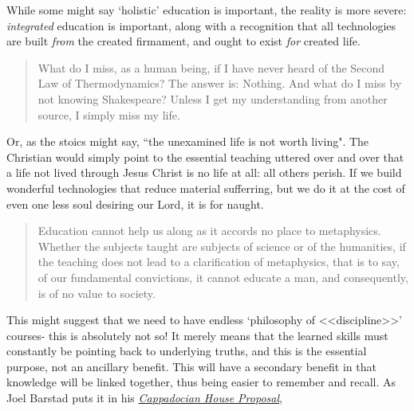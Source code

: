 \documentclass[letterpaper]{article}
\begin{document}
While some might say `holistic' education is important, the reality is more severe: \textit{integrated} education is important, along with a recognition that all technologies are built \textit{from} the created firmament, and ought to exist \textit{for} created life.

\begin{quote}
What do I miss, as a human being, if I have never heard of the Second Law of Thermodynamics? The answer is: Nothing. And what do I miss by not knowing Shakespeare? Unless I get my understanding from another source, I simply miss my life.
\end{quote}

Or, as the stoics might say, ``the unexamined life is not worth living". The Christian would simply point to the essential teaching uttered over and over that a life not lived through Jesus Christ is no life at all: all others perish. If we build wonderful technologies that reduce material sufferring, but we do it at the cost of even one less soul desiring our Lord, it is for naught.

\iffalse
Indeed to harken back to Eden,

\begin{quote}
  Sorrow is knowledge; they who know the most

  Must mourn the deepest o'er the fatal truth,

  The Tree of Knowledge is not that of Life.
  \attrib{\textit{Manfred}, George Gordon Byron 1817}
\end{quote}
\fi

\begin{quote}
  Education cannot help us along as it accords no place to metaphysics. Whether the subjects taught are subjects of science or of the humanities, if the teaching does not lead to a clarification of metaphysics, that is to say, of our fundamental convictions, it cannot educate a man, and consequently, is of no value to society.
\end{quote}

This might suggest that we need to have endless `philosophy of <<discipline>>' courses- this is absolutely not so! It merely means that the learned skills must constantly be pointing back to underlying truths, and this is the essential purpose, not an ancillary benefit. This will have a secondary benefit in that knowledge will be linked together, thus being easier to remember and recall. As Joel Barstad puts it in his \href{https://byzantinela.com/cappadocian-house-proposal/}{\textit{Cappadocian House Proposal}},
\end{document}
